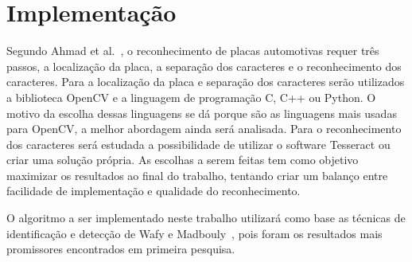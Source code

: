 \section{Implementação}
\label{sec:implementacao}

Segundo Ahmad et al.~\cite{ahmad2015automatic}, o reconhecimento de placas
automotivas requer três passos, a localização da placa, a separação dos
caracteres e o reconhecimento dos caracteres. Para a localização da placa e
separação dos caracteres serão utilizados a biblioteca OpenCV e a linguagem de
programação C, C++ ou Python. O motivo da escolha dessas linguagens se dá porque
são as linguagens mais usadas para OpenCV, a melhor abordagem ainda será
analisada. Para o reconhecimento dos caracteres será estudada a possibilidade de
utilizar o software Tesseract ou criar uma solução própria. As escolhas a serem
feitas tem como objetivo maximizar os resultados ao final do trabalho, tentando
criar um balanço entre facilidade de implementação e qualidade do
reconhecimento.

O algoritmo a ser implementado neste trabalho utilizará como base as técnicas de identificação e detecção de Wafy e Madbouly~\cite{wafy2016efficient}, pois foram os resultados mais promissores encontrados em primeira pesquisa.

